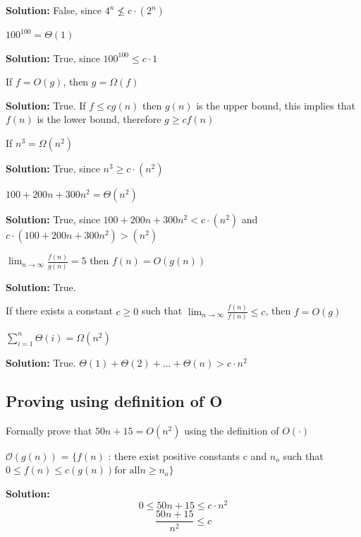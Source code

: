 \documentclass[11pt,fleqn]{book}
\begin{document}
\textbf{Solution:} False, since $4^n \not\leq c\cdot(2^n)$
\begin{example}
$100^{100} = \Theta(1)$
\end{example}
\textbf{Solution:} True, since $100^{100} \leq c \cdot 1$
\begin{example}
If $f = O(g)$, then $g = \Omega(f)$
\end{example}
\textbf{Solution:} True. If $f \leq c g(n)$ then $g(n)$ is the upper bound, this implies that $f(n)$ 
is the lower bound, therefore $g \geq c f(n)$
\begin{example}
If $n^3 = \Omega(n^2)$
\end{example}
\textbf{Solution:} True, since $n^3 \geq c \cdot(n^2)$
\begin{example}
$100 + 200n + 300n^2 = \Theta(n^2)$
\end{example}
\textbf{Solution:} True, since $100 + 200n + 300n^2 < c\cdot(n^2)$ and $c\cdot(100 + 200n + 300n^2) > (n^2)$
\begin{example}
$\lim_{n \to \infty} \frac{f(n)}{g(n)} = 5$ then $f(n) = O(g(n))$
\end{example}
\textbf{Solution:} True. 
\begin{definition}
If there exists a constant $c \geq 0$ such that $\lim_{n \to \infty} \frac{f(n)}{f(n)} \leq c$, then $f = O(g)$
\end{definition}
\begin{example}
$\sum_{i=1}^n \Theta(i) = \Omega(n^2)$
\end{example}
\textbf{Solution:} True. $\Theta(1) + \Theta(2) + \dots + \Theta(n) > c \cdot n^2$
\subsection{Proving using definition of O}
\vspace{1em}
\begin{example}
Formally prove that $50n + 15 = O(n^2)$ using the definition of $O(\cdot)$
\end{example}
\begin{definition}
$\mathcal{O}(g(n))$ = $\{f(n)$ : there exist positive constants c and  $n_o$ such that\\ $
    0 \leq f(n) \leq c(g(n)) \text{for all} n \geq n_o\}$
\end{definition}
\textbf{Solution:} $$0 \leq 50n + 15 \leq c\cdot n^2$$
$$\frac{50n + 15}{n^2} \leq c$$


\end{document}
